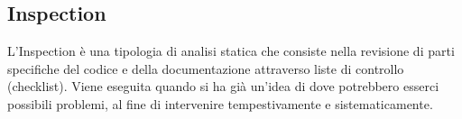 \subsection*{Inspection} 
L'Inspection è una tipologia di analisi statica che consiste nella revisione di parti specifiche del codice e della documentazione attraverso liste di controllo (checklist). Viene eseguita quando si ha già un’idea di dove potrebbero esserci possibili problemi, al fine di intervenire tempestivamente e sistematicamente.
